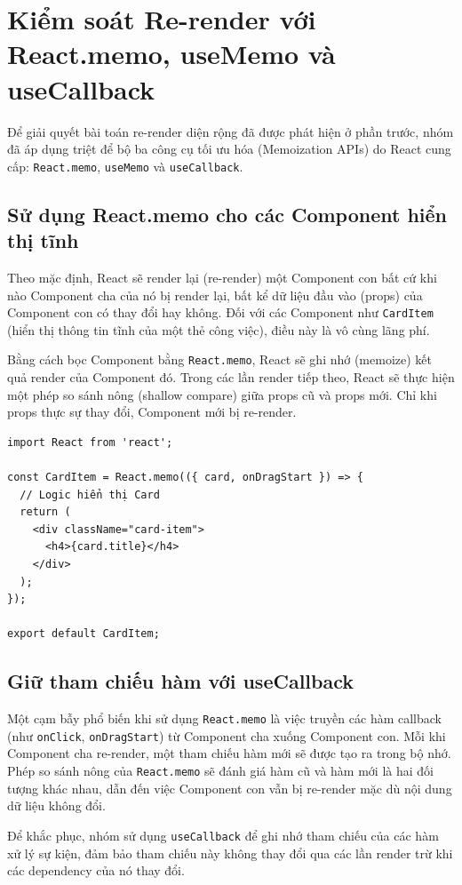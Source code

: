 \section{Kiểm soát Re-render với React.memo, useMemo và useCallback}
Để giải quyết bài toán re-render diện rộng đã được phát hiện ở phần trước, nhóm đã áp dụng triệt để bộ ba công cụ tối ưu hóa (Memoization APIs) do React cung cấp: \texttt{React.memo}, \texttt{useMemo} và \texttt{useCallback}.

\subsection{Sử dụng React.memo cho các Component hiển thị tĩnh}
Theo mặc định, React sẽ render lại (re-render) một Component con bất cứ khi nào Component cha của nó bị render lại, bất kể dữ liệu đầu vào (props) của Component con có thay đổi hay không. Đối với các Component như \texttt{CardItem} (hiển thị thông tin tĩnh của một thẻ công việc), điều này là vô cùng lãng phí.

Bằng cách bọc Component bằng \texttt{React.memo}, React sẽ ghi nhớ (memoize) kết quả render của Component đó. Trong các lần render tiếp theo, React sẽ thực hiện một phép so sánh nông (shallow compare) giữa props cũ và props mới. Chỉ khi props thực sự thay đổi, Component mới bị re-render.

\begin{Verbatim}
import React from 'react';

const CardItem = React.memo(({ card, onDragStart }) => {
  // Logic hiển thị Card
  return (
    <div className="card-item">
      <h4>{card.title}</h4>
    </div>
  );
});

export default CardItem;
\end{Verbatim}

\subsection{Giữ tham chiếu hàm với useCallback}
Một cạm bẫy phổ biến khi sử dụng \texttt{React.memo} là việc truyền các hàm callback (như \texttt{onClick}, \texttt{onDragStart}) từ Component cha xuống Component con. Mỗi khi Component cha re-render, một tham chiếu hàm mới sẽ được tạo ra trong bộ nhớ. Phép so sánh nông của \texttt{React.memo} sẽ đánh giá hàm cũ và hàm mới là hai đối tượng khác nhau, dẫn đến việc Component con vẫn bị re-render mặc dù nội dung dữ liệu không đổi.

Để khắc phục, nhóm sử dụng \texttt{useCallback} để ghi nhớ tham chiếu của các hàm xử lý sự kiện, đảm bảo tham chiếu này không thay đổi qua các lần render trừ khi các dependency của nó thay đổi.

